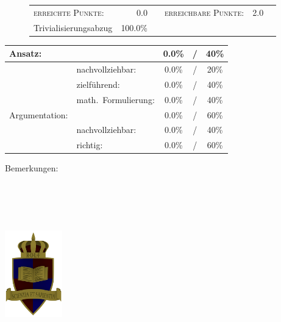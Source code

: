 \documentclass{article}
\begin{document}
\vspace{-0.5cm}
\begin{figure}[h!]
\begin{tabular}{lrcrcr}
\textsc{erreichte Punkte:} &0.0& & \textsc{erreichbare Punkte:} &2.0\\
\small Trivialisierungsabzug  & 100.0\% & & &
\end{tabular}
\end{figure}
\vspace{-0.1cm}
\begin{minipage}[t]{0.6\textwidth}
\flushleft
\begin{tabular}{l|lccc}
Ansatz:& &0.0\%&/&40\%\\\hline
&nachvollziehbar:&0.0\%&/&20\%\\
&zielf{\"u}hrend:&0.0\%&/&40\%\\
&math.~Formulierung:& 0.0\%&/&40\%\\\hline\hline
Argumentation:& &0.0\%&/&60\%\\\hline
&nachvollziehbar:&0.0\%&/&40\%\\
&richtig:&0.0\%&/&60\%\\\hline
\end{tabular}
\end{minipage}
\hfill
\begin{minipage}[t]{0.4\textwidth}
	\vspace{-1.75cm}
	Bemerkungen:\\\vspace*{0.2cm}
	\underline{\hspace{0.95\textwidth}}\\\vspace*{0.2cm}
	\underline{\hspace{0.95\textwidth}}
	\\\vspace*{0.2cm}
	\underline{\hspace{0.95\textwidth}}
	\\\vspace*{0.2cm}
	\underline{\hspace{0.95\textwidth}}
	\\\vspace*{0.2cm}
	\underline{\hspace{0.95\textwidth}}
\end{minipage}
	\vspace{0.5cm}\clearpage\vspace*{-2cm}
\parbox{4cm}{\includegraphics[width=2.5cm]{../images/ROLF4.png}}
\end{document}
